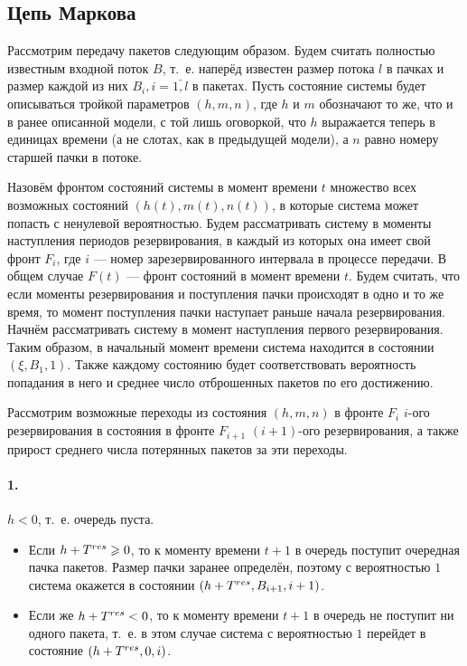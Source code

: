 \subsection{Цепь Маркова}

Рассмотрим передачу пакетов следующим образом. Будем считать полностью известным входной поток $B$, т.~е. наперёд известен размер потока $l$ в пачках и размер каждой из них $B_i, i=\bar{1, l}$ в пакетах. Пусть состояние системы будет описываться тройкой параметров $(h,m,n)$, где $h$ и $m$ обозначают то же, что и в ранее описанной модели, с той лишь оговоркой, что $h$ выражается теперь в единицах времени (а не слотах, как в предыдущей модели), а $n$ равно номеру старшей пачки в потоке.

Назовём фронтом состояний системы в момент времени $t$ множество всех возможных состояний $(h(t), m(t), n(t))$, в которые система может попасть с ненулевой вероятностью. Будем рассматривать систему в моменты наступления периодов резервирования, в каждый из которых она имеет свой фронт $F_i$, где $i$ --- номер зарезервированного интервала в процессе передачи.
В общем случае $F(t)$ --- фронт состояний в момент времени $t$.
Будем считать, что если моменты резервирования и поступления пачки происходят в одно и то же время, то момент поступления пачки наступает раньше начала резервирования.
Начнём рассматривать систему в момент наступления первого резервирования. Таким образом, в начальный момент времени система находится в состоянии $(\xi, B_1, 1)$. Также каждому состоянию будет соответствовать вероятность попадания в него и среднее число отброшенных пакетов по его достижению.

Рассмотрим возможные переходы из состояния $(h,m,n)$ в фронте $F_i$ $i$-ого резервирования в состояния в фронте $F_{i + 1}$ $(i+1)$-ого резервирования, а также прирост среднего числа потерянных пакетов за эти переходы.

\paragraph{1.} $h < 0$, т.~е. очередь пуста.

\begin{itemize}
\item Если $h + T^{res} \geqslant 0$, то к моменту времени $t + 1$ в очередь поступит очередная пачка пакетов. Размер пачки заранее определён, поэтому с вероятностью $1$ система окажется в состоянии $(h + T^{res}, B_{i+1}, i+1)$.

\item Если же $h + T^{res} < 0$, то к моменту времени $t + 1$ в очередь не поступит ни одного пакета, т.~е. в этом случае система с вероятностью $1$ перейдет в состояние $(h + T^{res}, 0, i)$. 
\end{itemize}

